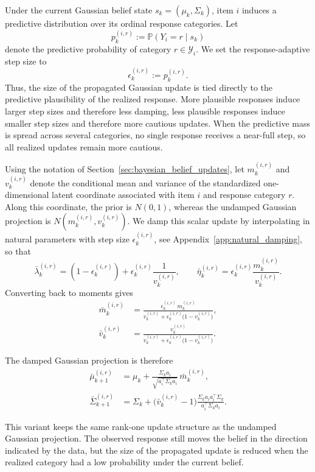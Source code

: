 \documentclass{article}
\begin{document}
Under the current Gaussian belief state $s_k=(\mu_k,\Sigma_k)$, item $i$
induces a predictive distribution over its ordinal response categories. Let
\[
p_k^{(i,r)} := \mathbb{P}(Y_i=r \mid s_k)
\]
denote the predictive probability of category $r \in \mathcal Y_i$. We set the
response-adaptive step size to
\[
\epsilon_k^{(i,r)} := p_k^{(i,r)}.
\]
Thus, the size of the propagated Gaussian update is tied directly to the predictive plausibility of the realized response. More plausible responses induce larger step sizes and therefore less damping, less plausible responses induce smaller step sizes and therefore more cautious updates. When the predictive mass is spread across several categories, no single response receives a near-full step, so all realized updates remain more cautious.

Using the notation of Section~\ref{sec:bayesian_belief_updates}, let $m_k^{(i,r)}$ and
$v_k^{(i,r)}$ denote the conditional mean and variance of the standardized
one-dimensional latent coordinate associated with item $i$ and response category
$r$. Along this coordinate, the prior is $N(0,1)$, whereas the undamped
Gaussian projection is $N(m_k^{(i,r)},v_k^{(i,r)})$. We damp this scalar update
by interpolating in natural parameters with step size $\epsilon_k^{(i,r)}$, see
Appendix~\ref{app:natural_damping}, so
that
\[
\bar{\lambda}_k^{(i,r)}
=
(1-\epsilon_k^{(i,r)})
+
\epsilon_k^{(i,r)}\frac{1}{v_k^{(i,r)}},
\qquad
\bar{\eta}_k^{(i,r)}
=
\epsilon_k^{(i,r)}\frac{m_k^{(i,r)}}{v_k^{(i,r)}}.
\]
Converting back to moments gives
\begin{align}
\bar{m}_k^{(i,r)}
&=
\frac{\epsilon_k^{(i,r)}\, m_k^{(i,r)}}
     {v_k^{(i,r)} + \epsilon_k^{(i,r)}\bigl(1-v_k^{(i,r)}\bigr)},
\label{eq:damped_m}
\\
\bar{v}_k^{(i,r)}
&=
\frac{v_k^{(i,r)}}
     {v_k^{(i,r)} + \epsilon_k^{(i,r)}\bigl(1-v_k^{(i,r)}\bigr)}.
\label{eq:damped_v}
\end{align}

The damped Gaussian projection is therefore
\begin{align}
\bar{\mu}_{k+1}^{(i,r)}
&=
\mu_k
+
\frac{\Sigma_k a_i}{\sqrt{a_i^\top\Sigma_k a_i}}\,
\bar{m}_k^{(i,r)},
\label{eq:damped_mu}
\\
\bar{\Sigma}_{k+1}^{(i,r)}
&=
\Sigma_k
+
\bigl(\bar{v}_k^{(i,r)} - 1\bigr)
\frac{\Sigma_k a_i a_i^\top \Sigma_k}{a_i^\top\Sigma_k a_i}.
\label{eq:damped_sigma}
\end{align}

This variant keeps the same rank-one update structure as the undamped Gaussian
projection. The observed response still moves the belief in the direction
indicated by the data, but the size of the propagated update is reduced when the
realized category had a low probability under the current belief.
\end{document}
